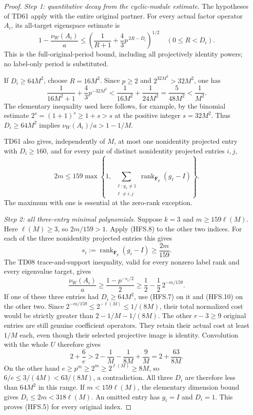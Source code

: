 \begin{proof}
\emph{Step 1: quantitative decay from the cyclic-module estimate.}
The hypotheses of TD61 apply with the entire original partner.
For every actual factor operator \(A_i\), its all-target
eigenspace estimate is
\[
 1-\frac{\nu_W(A_i)}a
 \le
 \left(\frac1{R+1}+\frac43p^{\,2R-D_i}\right)^{1/2}
       \quad(0\le R<D_i).
 \tag{HFS.6}
\]
This is the full-original-period bound, including all projectively
identity powers; no label-only period is substituted.

If \(D_i\ge64M^2\), choose \(R=16M^2\).
Since \(p\ge2\) and \(2^{32M^2}>32M^2\), one has
\[
 \frac1{16M^2+1}+\frac43p^{-32M^2}
 <
 \frac1{16M^2}+\frac1{24M^2}
 =\frac5{48M^2}<\frac1{M^2}.
 \tag{HFS.7}
\]
The elementary inequality used here follows, for example, by
the binomial estimate \(2^s=(1+1)^s\ge1+s>s\) at
the positive integer \(s=32M^2\).
Thus \(D_i\ge64M^2\) implies
\(\nu_W(A_i)/a>1-1/M\).

TD61 also gives, independently of \(M\), at most one nonidentity
projected entry with \(D_i\ge160\), and for every pair of
distinct nonidentity projected entries \(i,j\),
\[
 2m\le159\max\left\{1,\
       \sum_{\substack{\ell:y_\ell\ne1\\\ell\ne i,j}}
                    \operatorname{rank}_{\mathbf F_p}(g_\ell-I)
                    \right\}.
 \tag{HFS.8}
\]
The maximum with one is essential at the zero-rank exception.

\emph{Step 2: all three-entry minimal polynomials.}
Suppose \(k=3\) and \(m\ge159\ell(M)\).
Here \(\ell(M)\ge3\), so \(2m/159>1\).
Apply (HFS.8) to the other two indices.  For each of the three
nonidentity projected entries this gives
\[
       s_i:=\operatorname{rank}_{\mathbf F_p}(g_i-I)
                    \ge\frac{2m}{159}.
 \tag{HFS.9}
\]
The TD08 trace-and-support inequality, valid for every nonzero
label rank and every eigenvalue target, gives
\[
 \frac{\nu_W(A_i)}a
       \ge\frac{1-p^{-s_i/2}}2
       \ge\frac12-\frac12\,2^{-m/159}.
 \tag{HFS.10}
\]
If one of these three entries had \(D_i\ge64M^2\), use (HFS.7)
on it and (HFS.10) on the other two.
Since \(2^{-m/159}\le2^{-\ell(M)}\le1/(8M)\),
their total normalized cost would be strictly greater than
\(2-1/M-1/(8M)\).
The other \(r-3\ge9\) original entries are still genuine
coefficient operators.  They retain their actual cost at least
\(1/M\) each, even though their selected projective image is identity.
Convolution with the whole \(U\) therefore gives
\[
 2+\frac6e
   >2-\frac1M-\frac1{8M}+\frac9M
    =2+\frac{63}{8M}.
 \tag{HFS.11}
\]
On the other hand \(e\ge p^m\ge2^m\ge2^{\ell(M)}\ge8M\),
so \(6/e\le3/(4M)<63/(8M)\), a contradiction.
All three \(D_i\) are therefore less than \(64M^2\) in this range.
If \(m<159\ell(M)\), the elementary dimension bound gives
\(D_i\le2m<318\ell(M)\).
An omitted entry has \(g_i=I\) and \(D_i=1\).
This proves (HFS.5) for every original index.


\end{proof}
